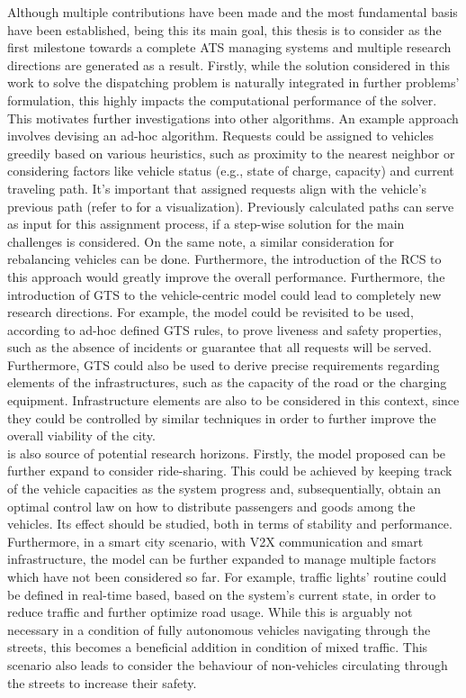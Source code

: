 Although multiple contributions have been made and the most fundamental basis have been established, being this its main goal, this thesis is to consider as the first milestone towards a complete ATS managing systems and multiple research directions are generated as a result. Firstly, while the solution considered in this work to solve the dispatching problem is naturally integrated in further problems' formulation, this highly impacts the computational performance of the solver. This motivates further investigations into other algorithms. An example approach involves devising an ad-hoc algorithm. Requests could be assigned to vehicles greedily based on various heuristics, such as proximity to the nearest neighbor or considering factors like vehicle status (e.g., state of charge, capacity) and current traveling path. It's important that assigned requests align with the vehicle's previous path (refer to  for a visualization). Previously calculated paths can serve as input for this assignment process, if a step-wise solution for the main challenges is considered. On the same note, a similar consideration for rebalancing vehicles can be done. Furthermore, the introduction of the RCS to this approach would greatly improve the overall performance. Furthermore, the introduction of GTS to the vehicle-centric model could lead to completely new research directions. For example, the model could be revisited to be used, according to ad-hoc defined GTS rules, to prove liveness and safety properties, such as the absence of incidents or guarantee that all requests will be served. Furthermore, GTS could also be used to derive precise requirements regarding elements of the infrastructures, such as the capacity of the road or the charging equipment. Infrastructure elements are also to be considered in this context, since they could be controlled by similar techniques in order to further improve the overall viability of the city.\\
 is also source of potential research horizons. Firstly, the model proposed can be further expand to consider ride-sharing. This could be achieved by keeping track of the vehicle capacities as the system progress and, subsequentially, obtain an optimal control law on how to distribute passengers and goods among the vehicles. Its effect should be studied, both in terms of stability and performance. Furthermore, in a smart city scenario, with V2X communication and smart infrastructure, the model can be further expanded to manage multiple factors which have not been considered so far. For example, traffic lights' routine could be defined in real-time based, based on the system's current state, in order to reduce traffic and further optimize road usage. While this is arguably not necessary in a condition of fully autonomous vehicles navigating through the streets, this becomes a beneficial addition in condition of mixed traffic. This scenario also leads to consider the behaviour of non-vehicles circulating through the streets to increase their safety. \\
